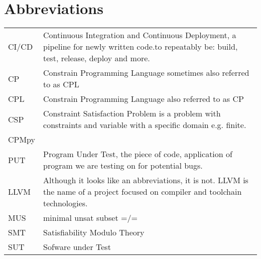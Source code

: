 \documentclass[master=cws,masteroption=se,english]{kulemt}
\begin{document}
\section*{Abbreviations}
\begin{flushleft}
  \renewcommand{\arraystretch}{1.1}
  \begin{tabularx}{\textwidth}{@{}p{12mm}X@{}}


	CI/CD &  Continuous Integration and Continuous Deployment, a pipeline for newly written code.to repeatably be: build, test, release, deploy and more. \\
    CP & Constrain Programming Language sometimes also referred to as CPL \\
    CPL & Constrain Programming Language also referred to as CP \\
    CSP & Constraint Satisfaction Problem is a problem with constraints and variable with a specific domain e.g. finite.\\
    CPMpy & \\
    PUT & Program Under Test, the piece of code, application of program we are testing on for potential bugs. \\
    LLVM & Although it looks like an abbreviations, it is not. LLVM is the name of a project focused on compiler and toolchain technologies. \\
    MUS & minimal unsat subset =/=  \\
    SMT & Satisfiability Modulo Theory\\
    SUT & Sofware under Test \\
  \end{tabularx}
\end{flushleft}
\end{document}
